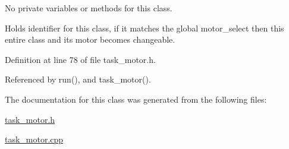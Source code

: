 No private variables or methods for this class. 

Holds identifier for this class, if it matches the global motor\-\_\-select then this entire class and its motor becomes changeable. 

Definition at line 78 of file task\-\_\-motor.\-h.



Referenced by run(), and task\-\_\-motor().



The documentation for this class was generated from the following files\-:\begin{DoxyCompactItemize}
\item 
\hyperlink{task__motor_8h}{task\-\_\-motor.\-h}\item 
\hyperlink{task__motor_8cpp}{task\-\_\-motor.\-cpp}\end{DoxyCompactItemize}

